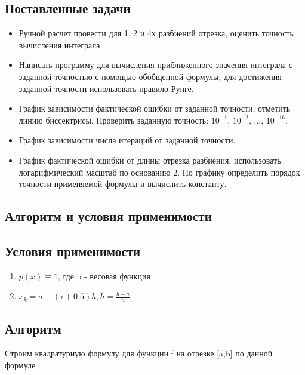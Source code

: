 \documentclass[12pt]{article}
\begin{document}
\subsection{Поставленные задачи}
\begin{itemize}
    \item Ручной расчет провести для 1, 2 и 4х разбиений отрезка,      оценить точность вычисления интеграла.
    
    \item Написать программу для вычисления приближенного значения     интеграла с заданной точностью с помощью обобщенной формулы, для достижения заданной точности использовать правило Рунге.             
    \item График зависимости фактической ошибки от заданной точности, отметить линию биссектрисы. Проверить заданную точность: $10^{-1}$, $10^{-2}$, ..., $10^{-16}$.

    \item График зависимости числа итераций от заданной точности.
    
    \item График фактической ошибки от длины отрезка разбиения, использовать логарифмический масштаб по основанию 2. По графику определить порядок точности применяемой формулы и вычислить константу.
\end{itemize}

\begin{center}
    \section{Алгоритм и условия применимости}

\end{center}

\subsection{Условия применимости}
\begin{enumerate}
    \item $p(x) \equiv1$, где p - весовая функция
    \item $x_k=a+(i+0.5)h, h=\frac{b-a}{n}$
\end{enumerate}

\subsection{Алгоритм}
Строим квадратурную формулу для функции f на отрезке [a,b] по данной формуле
\end{document}
